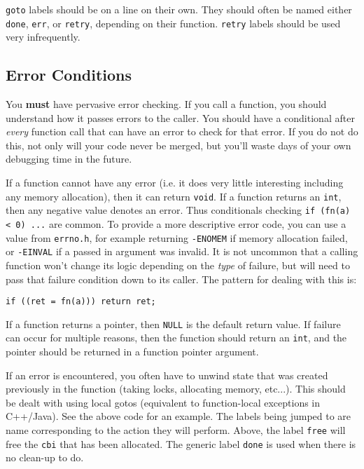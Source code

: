 \documentclass[11pt,onecolumn]{article}
\newcommand{\head}[1]{\vspace{0.4em}\noindent{\bf #1}}
\begin{document}
\head{{\tt goto} labels.} {\tt goto} labels should be on a line on
their own.  They should often be named either {\tt done}, {\tt err},
or {\tt retry}, depending on their function.  {\tt retry} labels
should be used very infrequently.

\subsection{Error Conditions}

You {\bf must} have pervasive error checking.  If you call a function,
you should understand how it passes errors to the caller.  You should
have a conditional after {\em every} function call that can have an
error to check for that error.  If you do not do this, not only will
your code never be merged, but you'll waste days of your own debugging
time in the future.

\head{Error values.} If a function cannot have any error (i.e. it does
very little interesting including any memory allocation), then it can
return {\tt void}.  If a function returns an {\tt int}, then any
negative value denotes an error.  Thus conditionals checking {\tt if
  (fn(a) < 0) ...} are common.  To provide a more descriptive error
code, you can use a value from {\tt errno.h}, for example returning
{\tt -ENOMEM} if memory allocation failed, or {\tt -EINVAL} if a
passed in argument was invalid.  It is not uncommon that a calling
function won't change its logic depending on the {\em type} of
failure, but will need to pass that failure condition down to its
caller.  The pattern for dealing with this is:

    \begin{minipage}{3in}
      \footnotesize
      \lstset{language=C}
      \begin{lstlisting}
if ((ret = fn(a))) return ret;
      \end{lstlisting}
    \end{minipage}

If a function returns a pointer, then {\tt NULL} is the default return
value.  If failure can occur for multiple reasons, then the function
should return an {\tt int}, and the pointer should be returned in a
function pointer argument.

\head{Error handling.} If an error is encountered, you often have to
unwind state that was created previously in the function (taking
locks, allocating memory, etc...).  This should be dealt with using
local gotos (equivalent to function-local exceptions in C++/Java).
See the above code for an example.  The labels being jumped to are
name corresponding to the action they will perform.  Above, the label
{\tt free} will free the {\tt cbi} that has been allocated.  The
generic label {\tt done} is used when there is no clean-up to do.
\end{document}
